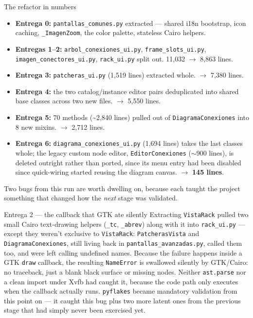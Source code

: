 \documentclass[10.4pt,twocolumn]{article}
\begin{document}
\begin{specbox}{The refactor in numbers}
\begin{itemize}[leftmargin=1.0em,itemsep=2pt,topsep=2pt]
\item \textbf{Entrega 0:} \texttt{pantallas\_comunes.py} extracted --- shared i18n bootstrap, icon caching, \texttt{\_ImagenZoom}, the color palette, stateless Cairo helpers.
\item \textbf{Entregas 1--2:} \texttt{arbol\_conexiones\_ui.py}, \texttt{frame\_slots\_ui.py}, \texttt{imagen\_conectores\_ui.py}, \texttt{rack\_ui.py} split out. 11{,}032 $\to$ 8{,}863 lines.
\item \textbf{Entrega 3:} \texttt{patcheras\_ui.py} (1{,}519 lines) extracted whole. $\to$ 7{,}380 lines.
\item \textbf{Entrega 4:} the two catalog/instance editor pairs deduplicated into shared base classes across two new files. $\to$ 5{,}550 lines.
\item \textbf{Entrega 5:} 70 methods (\textasciitilde2{,}840 lines) pulled out of \texttt{DiagramaConexiones} into 8 new mixins. $\to$ 2{,}712 lines.
\item \textbf{Entrega 6:} \texttt{diagrama\_conexiones\_ui.py} (1{,}694 lines) takes the last classes whole; the legacy custom node editor, \texttt{EditorConexiones} ($\sim$900 lines), is deleted outright rather than ported, since its menu entry had been disabled since quick-wiring started reusing the diagram canvas. $\to$ \textbf{145 lines}.
\end{itemize}
\end{specbox}

Two bugs from this run are worth dwelling on, because each taught the project something that changed how the \emph{next} stage was validated.

\begin{bugbox}{Entrega 2 --- the callback that GTK ate silently}
Extracting \texttt{VistaRack} pulled two small Cairo text-drawing helpers (\texttt{\_tc}, \texttt{\_abrev}) along with it into \texttt{rack\_ui.py} --- except they weren't exclusive to \texttt{VistaRack}: \texttt{PatcherasVista} and \texttt{DiagramaConexiones}, still living back in \texttt{pantallas\_avanzadas.py}, called them too, and were left calling undefined names. Because the failure happens inside a GTK \texttt{draw} callback, the resulting \texttt{NameError} is swallowed silently by GTK/Cairo: no traceback, just a blank black surface or missing nodes. Neither \texttt{ast.parse} nor a clean import under Xvfb had caught it, because the code path only executes when the callback actually runs. \texttt{pyflakes} became mandatory validation from this point on --- it caught this bug plus two more latent ones from the previous stage that had simply never been exercised yet.
\end{bugbox}
\end{document}

